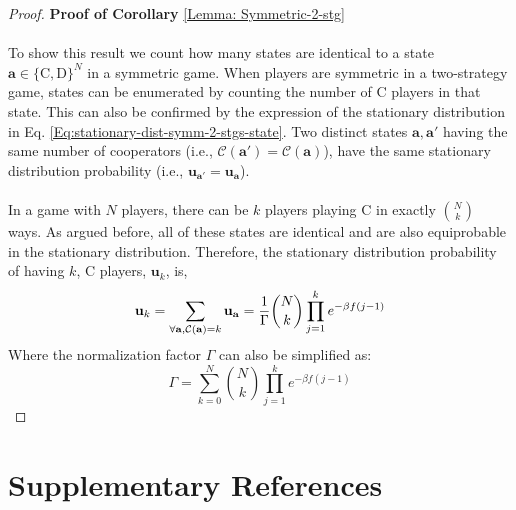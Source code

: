 \documentclass[11pt]{article}
\theoremstyle{plainCl1}
\theoremstyle{plainCl2}
\newcommand{\abf}{\mathbf{a}}
\newcommand{\ubf}{\mathbf{u}}
\newcommand{\C}{\mathrm{C}}
\newcommand{\D}{\mathrm{D}}
\begin{document}
\begin{proof}
\textbf{Proof of Corollary} \ref{Lemma: Symmetric-2-stg} \\ \\
To show this result we count how many states are identical to a state $\abf \in \{\C,\D\}^N$ in a symmetric game. When players are symmetric in a two-strategy game, states can be enumerated by counting the number of $\C$ players in that state. This can also be confirmed by the expression of the stationary distribution in Eq. \ref{Eq:stationary-dist-symm-2-stgs-state}. Two distinct states $\abf, \abf'$ having the same number of cooperators (i.e., $\mathcal{C}(\abf') = \mathcal{C}(\abf)$), have the same stationary distribution probability (i.e., $\ubf_{\abf'} = \ubf_{\abf}$).
\\ \\ 
\noindent In a game with $N$ players, there can be $k$ players playing $\C$ in exactly $N \choose k$ ways. As argued before, all of these states are identical and are also equiprobable in the stationary distribution. Therefore, the stationary distribution probability of having $k$, $\C$ players, $\ubf_{k}$, is,
\begin{equation}
\ubf_{k} = \sum_{\forall \abf,  \mathcal{C(\abf)} = k} \ubf_\abf = \frac{1}{\Gamma} {N \choose k} \prod_{j=1}^k e^{-\beta f(j-1)} \\[10pt]
\end{equation} 
\noindent Where the normalization factor $\Gamma$ can also be simplified as: 
\begin{equation}
\Gamma = \sum_{k=0}^N {N \choose k} \prod_{j=1}^k e^{-\beta f(j-1)}
\end{equation}
\end{proof}
\newpage
\section*{Supplementary References}


\end{document}
